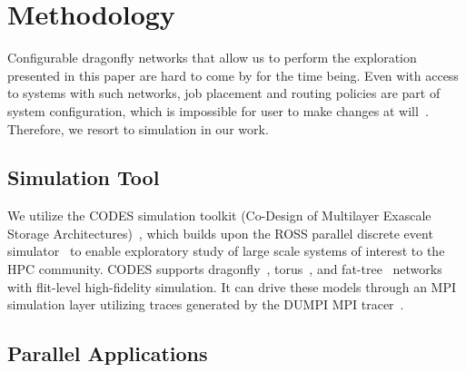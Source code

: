 

\section{Methodology}
\label{sec: methodology}

Configurable dragonfly networks that allow us to perform the exploration presented in this paper are hard to come by for the time being. Even with access to systems with such networks, job placement and routing policies are part of system configuration, which is impossible for user to make changes at will~\cite{jain-sc14, bhatele-sc11, zhou-ipdps-2015, jokanovic-ipdps-2015}. Therefore, we resort to simulation in our work.



\subsection{Simulation Tool}
\label{sec:simulation-tool}

We utilize the CODES simulation toolkit (Co-Design of Multilayer Exascale Storage Architectures)~\cite{codes}, which builds upon the ROSS parallel discrete event simulator~\cite{carothers_ross:_2002,barnes_warp_2013} to enable exploratory study of large scale systems of interest to the HPC community. CODES supports dragonfly~\cite{codes-dragonfly, misbah-tpds}, torus~\cite{misbah-pads-2014, ning-pads-2011}, and fat-tree~\cite{ning-pads-2015} networks with flit-level high-fidelity simulation. It can drive these models through an MPI simulation layer utilizing traces generated by the DUMPI MPI tracer~\cite{sst}.

\subsection{Parallel Applications}
\label{sec: application traces}

